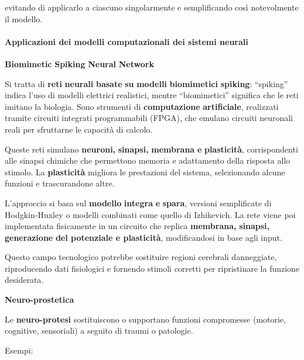 \documentclass[12pt,a4paper]{book}
\begin{document}
evitando di applicarlo a ciascuno singolarmente e semplificando così notevolmente il modello.


\paragraph{Applicazioni dei modelli computazionali dei sistemi neurali}

\textbf{Biomimetic}\textbf{ }\textbf{Spiking}\textbf{ }\textbf{Neural}\textbf{ }\textbf{Network}

Si tratta di \textbf{reti}\textbf{ }\textbf{neurali}\textbf{ }\textbf{basate}\textbf{ }\textbf{su}\textbf{ }\textbf{modelli}\textbf{ }\textbf{biomimetici}\textbf{ }\textbf{spiking}: ``spiking'' indica l'uso di modelli elettrici realistici, mentre ``biomimetici'' significa che le reti imitano la biologia. Sono strumenti di \textbf{computazione}\textbf{ }\textbf{artificiale}, realizzati tramite circuiti integrati programmabili (FPGA), che emulano circuiti neuronali reali per sfruttarne le capacità di calcolo.

Queste reti simulano \textbf{neuroni,}\textbf{ }\textbf{sinapsi,}\textbf{ }\textbf{membrana}\textbf{ }\textbf{e}\textbf{ }\textbf{plasticità}, corrispondenti alle sinapsi chimiche che permettono memoria e adattamento della risposta allo stimolo. La \textbf{plasticità}\textbf{ }migliora le prestazioni del sistema, selezionando alcune funzioni e trascurandone altre.

L'approccio si basa sul \textbf{modello}\textbf{ }\textbf{integra}\textbf{ }\textbf{e}\textbf{ }\textbf{spara}, versioni semplificate di Hodgkin-Huxley o modelli combinati come quello di Izhikevich. La rete viene poi implementata fisicamente in un circuito che replica \textbf{membrana,}\textbf{ }\textbf{sinapsi,}\textbf{ }\textbf{generazione}\textbf{ }\textbf{del potenziale e plasticità}, modificandosi in base agli input.

Questo campo tecnologico potrebbe sostituire regioni cerebrali danneggiate, riproducendo dati fisiologici e fornendo stimoli corretti per ripristinare la funzione desiderata.

\textbf{Neuro-}\textbf{prostetica}

Le \textbf{neuro-protesi}\textbf{ }sostituiscono o supportano funzioni compromesse (motorie, cognitive, sensoriali) a seguito di traumi o patologie.

Esempi:
\end{document}
